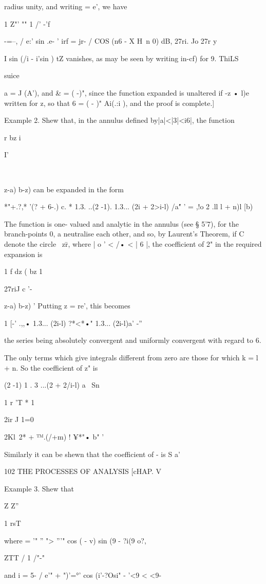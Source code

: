 {{radius unity, and writing = e', we have

1 Z"' "" 1 /' -'f

 -=--, / e:' sin .e- ' irf = jr- / COS (n6 - X H\ n 0) dB, 27ri. Jo
27r y

I sin (/i - i'sin ) tZ vanishes, as may be seen by writing in-cf) for
9. ThiLS

suice

a = J (A'), and \& = ( -)", since the function expanded is unaltered
if -z • l)e written for z, so that 6 = ( - )" Ai(.:i ), and the proof
is complete.]

Example 2. Shew that, in the annulus defined by|a|<|3|<i6|, the
function

r bz i

I'

\ \ {z-a) b-z) can be expanded in the form

*"+.?,* '(? + 6-.) c. * 1.3. ..(2 -1). 1.3... (2i + 2>i-l) /a\' " ' =
,!o 2 .ll l + n)l [b)

The function is one- valued and analytic in the annulus (see § 5'7),
for the branch-points 0, a neutralise each other, and so, by Laurent's
Theorem, if C denote the circle \ z\=r, where | o ' < /• < | 6 |, the
coefficient of 2" in the required expansion is

1 f dz ( bz 1

27riJ c '- \ \ {z-a) b-z) ' Putting z = re', this becomes

1 [-' .,,• 1.3... (2i-l) ?*<*•" 1.3... (2i-l)a' -''

the series being absolutely convergent and uniformly convergent with
regard to 6.

The only terms which give integrals different from zero are those for
which k = l + n. So the coefficient of z" is

(2 -1) 1 . 3 ...(2 + 2/i-l) a \ Sn

1 r 'T * 1

2ir J 1=0

2Kl\ 2* + ™.(/+m) ! ¥*"• b" '

Similarly it can be shewn that the coefficient of - is S a'\

102 THE PROCESSES OF ANALYSIS [cHAP. V

Example 3. Shew that

Z Z''

1 rsT

where = '" '' "> '''" cos ( - v) sin (9 - ?i(9 o?,

ZTT / 1 /"-"

and i = 5- / e'" + ")'=°' cos (i'-?Osi" - '<9 < <9-

}}}}
